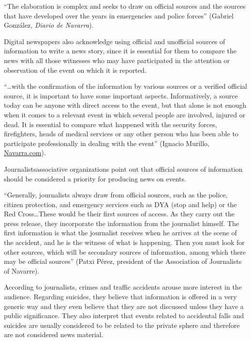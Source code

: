 \enquote{The elaboration is complex and seeks to draw on official sources and
the sources that have developed over the years in emergencies and police
forces} (Gabriel González, \emph{Diario de Navarra}).

Digital newspapers also acknowledge using official and unofficial
sources of information to write a news story, since it is essential for
them to compare the news with all those witnesses who may have
participated in the attention or observation of the event on which it is
reported.

\enquote{\ldots with the confirmation of the information by various sources or a
verified official source, it is important to have some important
aspects. Informatively, a source today can be anyone with direct access
to the event, but that alone is not enough when it comes to a relevant
event in which several people are involved, injured or dead. It is
essential to compare what happened with the security forces,
firefighters, heads of medical services or any other person who has been
able to participate professionally in dealing with the event} (Ignacio
Murillo, \url{Navarra.com}).

Journalists\textquotesingle associative organizations point out that
official sources of information should be considered a priority for
producing news on events.

\enquote{Generally, journalists always draw from official sources, such as the
police, citizen protection, and emergency services such as DYA (stop and
help) or the Red Cross\ldots These would be their first sources of access.
As they carry out the press release, they incorporate the information
from the journalist himself. The first information is what the
journalist receives when he arrives at the scene of the accident, and he
is the witness of what is happening. Then you must look for other
sources, which will be secondary sources of information, among which
there may be official sources} (Patxi Pérez, president of the
Association of Journalists of Navarre).

According to journalists, crimes and traffic accidents arouse more
interest in the audience. Regarding suicides, they believe that
information is offered in a very generic way and they even believe that
they are not discussed unless they have a public significance. They also
interpret that events related to accidental falls and suicides are
usually considered to be related to the private sphere and therefore are
not considered news material.

